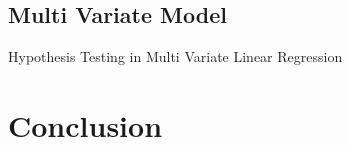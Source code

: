 \documentclass[11pt,a4paper]{article}
\begin{document}
\subsection{Multi Variate Model}
\begin{table}[H]
    \centering
    \caption{Hypothesis Testing in Multi Variate Linear Regression}
\end{table}

\newpage
\section{Conclusion}
\end{document}

